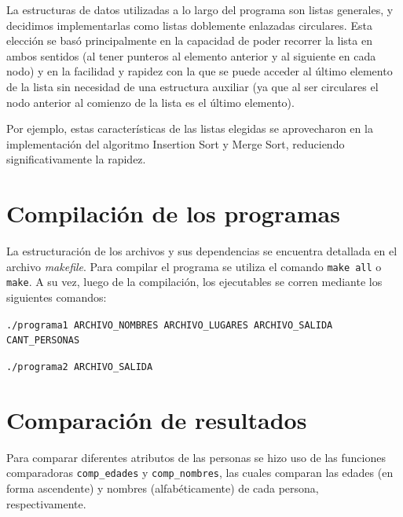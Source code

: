 \documentclass[11pt]{article}
\begin{document}
La estructuras de datos utilizadas a lo largo del programa son listas generales, y decidimos implementarlas como listas doblemente enlazadas circulares. Esta elección se basó principalmente en la capacidad de poder recorrer la lista en ambos sentidos (al tener punteros al elemento anterior y al siguiente en cada nodo) y en la facilidad y rapidez con la que se puede acceder al último elemento de la lista sin necesidad de una estructura auxiliar (ya que al ser circulares el nodo anterior al comienzo de la lista es el último elemento).\par

Por ejemplo, estas características de las listas elegidas se aprovecharon en la implementación del algoritmo Insertion Sort y Merge Sort, reduciendo significativamente la rapidez.\par

\section{Compilación de los programas}

La estructuración de los archivos y sus dependencias se encuentra detallada en el archivo \textit{makefile}. Para compilar el programa se utiliza el comando \verb|make all| o \verb|make|. A su vez, luego de la compilación, los ejecutables se corren mediante los siguientes comandos:\par

\noindent \verb|./programa1 ARCHIVO_NOMBRES ARCHIVO_LUGARES ARCHIVO_SALIDA CANT_PERSONAS| \par
\noindent \verb|./programa2 ARCHIVO_SALIDA|\par


\section{Comparación de resultados}

Para comparar diferentes atributos de las personas se hizo uso de las funciones comparadoras \verb|comp_edades| y \verb|comp_nombres|, las cuales comparan las edades (en forma ascendente) y nombres (alfabéticamente) de cada persona, respectivamente.\par
\end{document}
